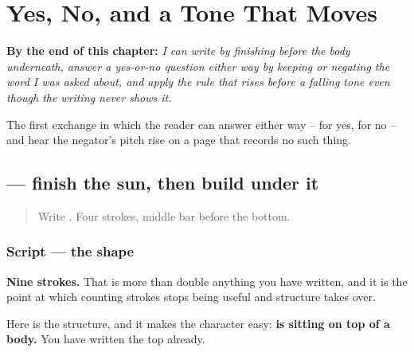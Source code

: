 
\chapter{Yes, No, and a Tone That Moves}
\label{ch:zh-shi}

\begin{chapteropening}
\textbf{By the end of this chapter:} \emph{I can write  by finishing  before the body underneath, answer a yes-or-no question either way by keeping or negating the word I was asked about, and apply the rule that  rises before a falling tone even though the writing never shows it.}

The first exchange in which the reader can answer either way --  for yes,  for no -- and hear the negator's pitch rise on a page that records no such thing.
\end{chapteropening}

\section[\texorpdfstring{\zh{是} (shì)}{是 (shì)}]{ — finish the sun, then build under it}

\label{lesson:ZH-W05-shi}



\begin{quote}
Write . Four strokes, middle bar before the bottom.
\end{quote}

\subsection*{Script — the shape}

\begin{quote}
\end{quote}

\textbf{Nine strokes.} That is more than double anything you have written, and it is the point at which counting strokes stops being useful and structure takes over.

Here is the structure, and it makes the character easy: \textbf{ is  sitting on top of a body.} You have written the top already.

